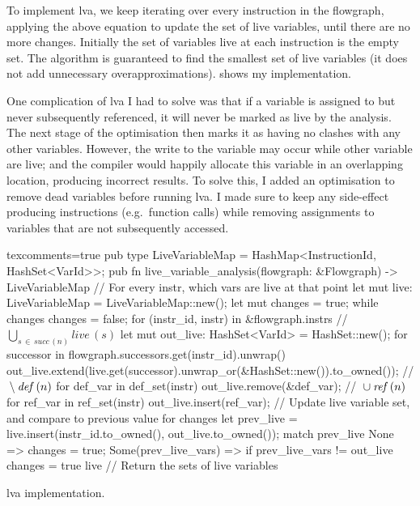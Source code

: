\documentclass[00-main.tex]{subfiles}
\begin{document}
To implement \gls{lva}, we keep iterating over every instruction in the flowgraph, applying the above equation to update the set of live variables, until there are no more changes.
Initially the set of variables live at each instruction is the empty set.
The algorithm is guaranteed to find the smallest set of live variables (it does not add unnecessary overapproximations).
 shows my implementation.

One complication of \gls{lva} I had to solve was that if a variable is assigned to but never subsequently referenced, it will never be marked as live by the analysis.
The next stage of the optimisation then marks it as having no clashes with any other variables.
However, the write to the variable may occur while other variable are live; and the compiler would happily allocate this variable in an overlapping location, producing incorrect results.
To solve this, I added an optimisation to remove dead variables before running \gls{lva}.
I made sure to keep any side-effect producing instructions (e.g.\ function calls) while removing assignments to variables that are not subsequently accessed.

\begin{listing}[H]
  \begin{RustListing*}{texcomments=true}
    pub type LiveVariableMap = HashMap<InstructionId, HashSet<VarId>>;
    pub fn live_variable_analysis(flowgraph: &Flowgraph) -> LiveVariableMap {
        // For every instr, which vars are live at that point
        let mut live: LiveVariableMap = LiveVariableMap::new();
        let mut changes = true;
        while changes {
            changes = false;
            for (instr_id, instr) in &flowgraph.instrs {
                // $\bigcup_{s \,\in\, \mathit{succ}\,(n)} \mathit{live}\,(s)$
                let mut out_live: HashSet<VarId> = HashSet::new();
                for successor in flowgraph.successors.get(instr_id).unwrap() {
                    out_live.extend(live.get(successor).unwrap_or(&HashSet::new()).to_owned());
                }
                // ${} \setminus \lvadef\,(n)$
                for def_var in def_set(instr) {
                    out_live.remove(&def_var);
                }
                // ${} \cup \lvaref\,(n)$
                for ref_var in ref_set(instr) {
                    out_live.insert(ref_var);
                }
                // Update live variable set, and compare to previous value for changes
                let prev_live = live.insert(instr_id.to_owned(), out_live.to_owned());
                match prev_live {
                    None => {
                        changes = true;
                    }
                    Some(prev_live_vars) => {
                        if prev_live_vars != out_live {
                            changes = true
                        }
                    }
                }
            }
        }
        live // Return the sets of live variables
    }
  \end{RustListing*}
  \caption{\Acrlong{lva} implementation.}
  \label{lst:lva implementation}
\end{listing}
\end{document}
